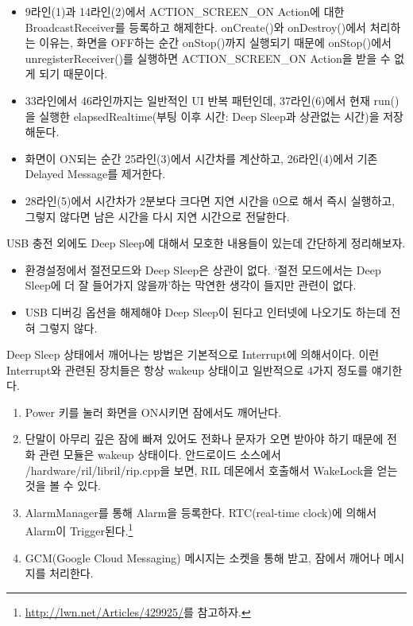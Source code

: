 \begin{itemize}
\item 9라인(1)과 14라인(2)에서 ACTION\_SCREEN\_ON Action에 대한 BroadcastReceiver를 등록하고 해제한다. onCreate()와 onDestroy()에서 처리하는 이유는, 화면을 OFF하는 순간 onStop()까지 실행되기 때문에 onStop()에서 unregisterReceiver()를 실행하면 ACTION\_SCREEN\_ON Action을 받을 수 없게 되기 때문이다.
\item 33라인에서 46라인까지는 일반적인 UI 반복 패턴인데, 37라인(6)에서 현재 run()을 실행한 elapsedRealtime(부팅 이후 시간: Deep Sleep과 상관없는 시간)을 저장해둔다.
\item 화면이 ON되는 순간 25라인(3)에서 시간차를 계산하고, 26라인(4)에서 기존 Delayed Message를 제거한다.
\item 28라인(5)에서 시간차가 2분보다 크다면 지연 시간을 0으로 해서 즉시 실행하고, 그렇지 않다면 남은 시간을 다시 지연 시간으로 전달한다.
\end{itemize}

USB 충전 외에도 Deep Sleep에 대해서 모호한 내용들이 있는데 간단하게 정리해보자.
\begin{itemize}
\item 환경설정에서 절전모드와 Deep Sleep은 상관이 없다. `절전 모드에서는 Deep Sleep에 더 잘 들어가지 않을까'하는 막연한 생각이 들지만 관련이 없다.
\item USB 디버깅 옵션을 해제해야 Deep Sleep이 된다고 인터넷에 나오기도 하는데 전혀 그렇지 않다.
\end{itemize}


Deep Sleep 상태에서 깨어나는 방법은 기본적으로 Interrupt에 의해서이다. 
이런 Interrupt와 관련된 장치들은 항상 wakeup 상태이고 일반적으로 4가지 정도를 얘기한다. 
\begin{enumerate}
\item Power 키를 눌러 화면을 ON시키면 잠에서도 깨어난다.
\item 단말이 아무리 깊은 잠에 빠져 있어도 전화나 문자가 오면 받아야 하기 때문에 전화 관련 모듈은 wakeup 상태이다. 안드로이드 소스에서 /hardware/ril/libril/rip.cpp을 보면, RIL 데몬에서 호출해서 WakeLock을 얻는 것을 볼 수 있다.
\item AlarmManager를 통해 Alarm을 등록한다. RTC(real-time clock)에 의해서 Alarm이 Trigger된다.\footnote{\url{http://lwn.net/Articles/429925/}를 참고하자.}
\item GCM(Google Cloud Messaging) 메시지는 소켓을 통해 받고, 잠에서 깨어나 메시지를 처리한다.
\end{enumerate}
 
